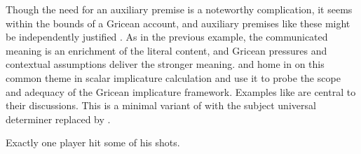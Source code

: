 \documentclass[leqno,12pt]{article}
\begin{document}
Though the need for an auxiliary premise is a noteworthy complication,
it seems within the bounds of a Gricean account, and auxiliary
premises like these might be independently justified
\citep{Russell06}. As in the previous example, the communicated
meaning is an enrichment of the literal content, and Gricean pressures
and contextual assumptions deliver the stronger
meaning. \citet{Geurts:Pouscoulous:2009} and
\citet{Chemla:Spector:2011} home in on this common theme in scalar
implicature calculation and use it to probe the scope and adequacy of
the Gricean implicature framework. Examples like 
are central to their discussions.  This is a minimal variant of 
with the subject universal determiner  replaced by
.
%
\begin{examples}
\item\label{exactlyonesome} Exactly one player hit some of his shots.
\end{examples}
\end{document}
